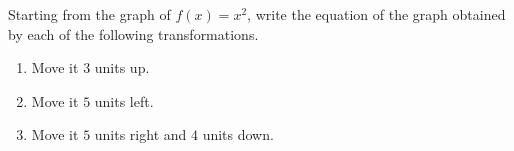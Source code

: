 Starting from the graph of $f(x)=x^2$, write the equation of the graph obtained by each of the following transformations.
\begin{enumerate}
\item[1.] Move it $3$ units up.
\item[2.] Move it $5$ units left.
\item[3.] Move it $5$ units right and $4$ units down.
\end{enumerate}
